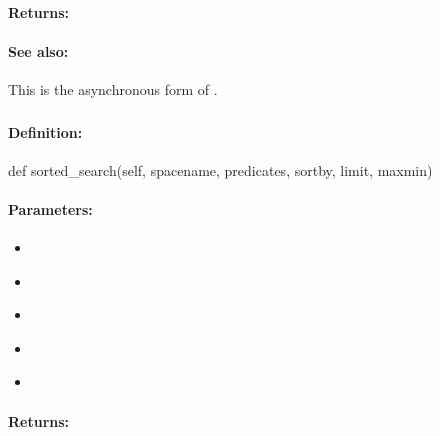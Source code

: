 \paragraph{Returns:}


\paragraph{See also:}  This is the asynchronous form of .

\pagebreak
\subsubsection{}
\label{api:python:sorted_search}


\paragraph{Definition:}
\begin{pythoncode}
def sorted_search(self, spacename, predicates, sortby, limit, maxmin)
\end{pythoncode}

\paragraph{Parameters:}
\begin{itemize}[noitemsep]
\item {}\\

\item {}\\

\item {}\\

\item {}\\

\item {}\\

\end{itemize}

\paragraph{Returns:}



